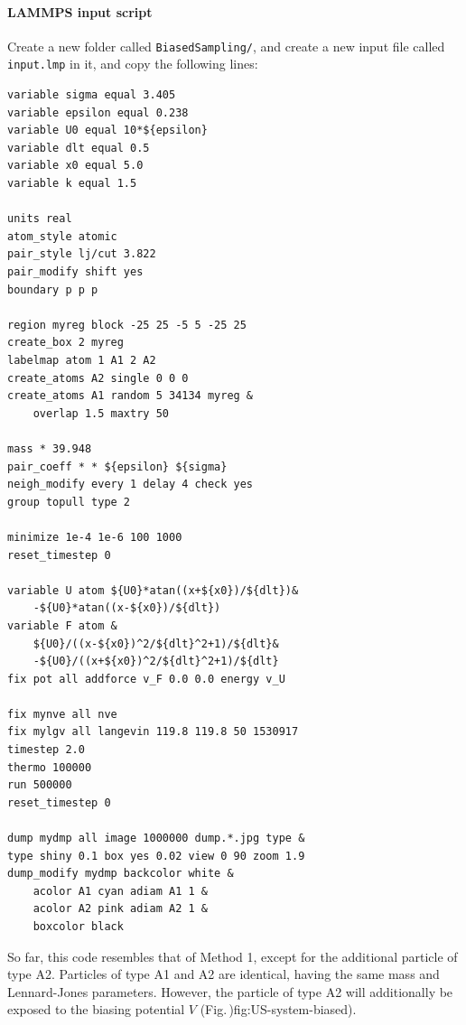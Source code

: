 \documentclass[9pt,tutorial]{livecoms}
\newcommand{\flrcmd}[1]{\textcolor{command}{\texttt{#1}}} %
\newcommand{\flecmd}[1]{\textcolor{command}{\texttt{#1}}} %
\begin{document}
\paragraph{LAMMPS input script}
Create a new folder called \flrcmd{BiasedSampling/}, and create a new input file
called \flecmd{input.lmp} in it, and copy the following lines:
\begin{lstlisting}
variable sigma equal 3.405
variable epsilon equal 0.238
variable U0 equal 10*${epsilon}
variable dlt equal 0.5
variable x0 equal 5.0
variable k equal 1.5

units real
atom_style atomic
pair_style lj/cut 3.822
pair_modify shift yes
boundary p p p

region myreg block -25 25 -5 5 -25 25
create_box 2 myreg
labelmap atom 1 A1 2 A2
create_atoms A2 single 0 0 0
create_atoms A1 random 5 34134 myreg &
    overlap 1.5 maxtry 50

mass * 39.948
pair_coeff * * ${epsilon} ${sigma}
neigh_modify every 1 delay 4 check yes
group topull type 2

minimize 1e-4 1e-6 100 1000
reset_timestep 0

variable U atom ${U0}*atan((x+${x0})/${dlt})&
    -${U0}*atan((x-${x0})/${dlt})
variable F atom &
    ${U0}/((x-${x0})^2/${dlt}^2+1)/${dlt}&
    -${U0}/((x+${x0})^2/${dlt}^2+1)/${dlt}
fix pot all addforce v_F 0.0 0.0 energy v_U

fix mynve all nve
fix mylgv all langevin 119.8 119.8 50 1530917
timestep 2.0
thermo 100000
run 500000
reset_timestep 0

dump mydmp all image 1000000 dump.*.jpg type &
type shiny 0.1 box yes 0.02 view 0 90 zoom 1.9
dump_modify mydmp backcolor white &
    acolor A1 cyan adiam A1 1 &
    acolor A2 pink adiam A2 1 &
    boxcolor black
\end{lstlisting}
So far, this code resembles that of Method 1, except for the additional particle
of type A2. Particles of type A1 and A2
are identical, having the same mass and Lennard-Jones parameters. However, the
particle of type A2 will additionally be exposed to the biasing potential
$V$ (Fig.\,){fig:US-system-biased}).
\end{document}
